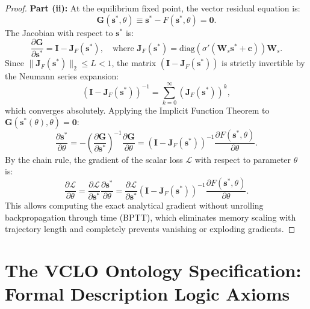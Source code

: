 \documentclass[11pt,a4paper]{article}
\begin{document}
\begin{proof}
\textbf{Part (ii):} At the equilibrium fixed point, the vector residual equation is:
\begin{equation}
\mathbf{G}(\mathbf{s}^*, \theta) \equiv \mathbf{s}^* - F(\mathbf{s}^*, \theta) = \mathbf{0}.
\end{equation}
The Jacobian with respect to $\mathbf{s}^*$ is:
\begin{equation}
\frac{\partial \mathbf{G}}{\partial \mathbf{s}^*} = \mathbf{I} - \mathbf{J}_F(\mathbf{s}^*), \quad \text{where } \mathbf{J}_F(\mathbf{s}^*) = \mathrm{diag}(\sigma'(\mathbf{W}_s \mathbf{s}^* + \mathbf{c})) \mathbf{W}_s.
\end{equation}
Since $\|\mathbf{J}_F(\mathbf{s}^*)\|_2 \le L < 1$, the matrix $(\mathbf{I} - \mathbf{J}_F(\mathbf{s}^*))$ is strictly invertible by the Neumann series expansion:
\begin{equation}
(\mathbf{I} - \mathbf{J}_F(\mathbf{s}^*))^{-1} = \sum_{k=0}^\infty (\mathbf{J}_F(\mathbf{s}^*))^k,
\end{equation}
which converges absolutely. Applying the Implicit Function Theorem to $\mathbf{G}(\mathbf{s}^*(\theta), \theta) = \mathbf{0}$:
\begin{equation}
\frac{\partial \mathbf{s}^*}{\partial \theta} = - \left( \frac{\partial \mathbf{G}}{\partial \mathbf{s}^*} \right)^{-1} \frac{\partial \mathbf{G}}{\partial \theta} = (\mathbf{I} - \mathbf{J}_F(\mathbf{s}^*))^{-1} \frac{\partial F(\mathbf{s}^*, \theta)}{\partial \theta}.
\end{equation}
By the chain rule, the gradient of the scalar loss $\mathcal{L}$ with respect to parameter $\theta$ is:
\begin{equation}
\frac{\partial \mathcal{L}}{\partial \theta} = \frac{\partial \mathcal{L}}{\partial \mathbf{s}^*} \frac{\partial \mathbf{s}^*}{\partial \theta} = \frac{\partial \mathcal{L}}{\partial \mathbf{s}^*} (\mathbf{I} - \mathbf{J}_F(\mathbf{s}^*))^{-1} \frac{\partial F(\mathbf{s}^*, \theta)}{\partial \theta}.
\end{equation}
This allows computing the exact analytical gradient without unrolling backpropagation through time (BPTT), which eliminates memory scaling with trajectory length and completely prevents vanishing or exploding gradients.
\end{proof}

\section{The VCLO Ontology Specification: Formal Description Logic Axioms}
\label{sec:appendix_vclo_axioms}
\end{document}
